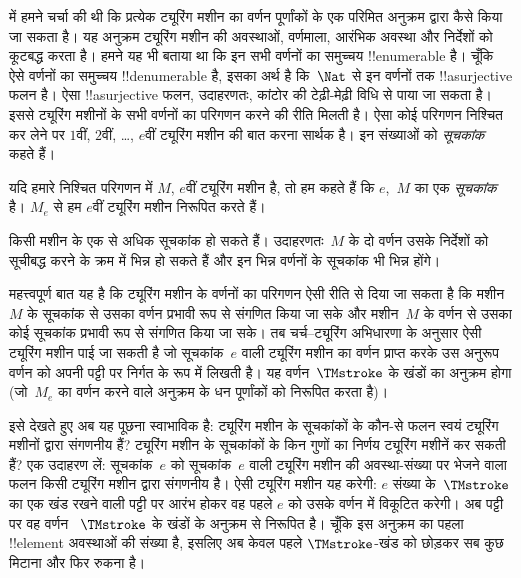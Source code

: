 \documentclass[../../../include/open-logic-section]{subfiles}
\begin{document}

 में हमने चर्चा की थी कि प्रत्येक ट्यूरिंग मशीन का वर्णन
पूर्णांकों के एक परिमित अनुक्रम द्वारा कैसे किया जा सकता है। यह अनुक्रम
ट्यूरिंग मशीन की अवस्थाओं, वर्णमाला, आरंभिक अवस्था और निर्देशों को
कूटबद्ध करता है। हमने यह भी बताया था कि इन सभी वर्णनों का समुच्चय
!!{enumerable} है। चूँकि ऐसे वर्णनों का समुच्चय !!{denumerable} है,
इसका अर्थ है कि~$\Nat$ से इन वर्णनों तक !!a{surjective} फलन है। ऐसा
!!a{surjective} फलन, उदाहरणतः, कांटोर की टेढ़ी-मेढ़ी विधि से पाया जा
सकता है। इससे ट्यूरिंग मशीनों के सभी वर्णनों का परिगणन करने की रीति
मिलती है। ऐसा कोई परिगणन निश्चित कर लेने पर $1$वीं, $2$वीं, \dots,
$e$वीं ट्यूरिंग मशीन की बात करना सार्थक है। इन संख्याओं को
\emph{सूचकांक} कहते हैं।

\begin{defn}
यदि हमारे निश्चित परिगणन में $M$, $e$वीं ट्यूरिंग मशीन है, तो हम कहते
हैं कि $e$,~$M$ का एक \emph{सूचकांक} है। $M_e$ से हम $e$वीं ट्यूरिंग
मशीन निरूपित करते हैं।
\end{defn}

किसी मशीन के एक से अधिक सूचकांक हो सकते हैं। उदाहरणतः~$M$ के दो वर्णन
उसके निर्देशों को सूचीबद्ध करने के क्रम में भिन्न हो सकते हैं और इन
भिन्न वर्णनों के सूचकांक भी भिन्न होंगे।

महत्त्वपूर्ण बात यह है कि ट्यूरिंग मशीन के वर्णनों का परिगणन ऐसी रीति
से दिया जा सकता है कि मशीन~$M$ के सूचकांक से उसका वर्णन प्रभावी रूप से
संगणित किया जा सके और मशीन~$M$ के वर्णन से उसका कोई सूचकांक प्रभावी रूप
से संगणित किया जा सके। तब चर्च--ट्यूरिंग अभिधारणा के अनुसार ऐसी ट्यूरिंग
मशीन पाई जा सकती है जो सूचकांक~$e$ वाली ट्यूरिंग मशीन का वर्णन प्राप्त
करके उस अनुरूप वर्णन को अपनी पट्टी पर निर्गत के रूप में लिखती है। यह
वर्णन~$\TMstroke$ के खंडों का अनुक्रम होगा (जो~$M_e$ का वर्णन करने वाले
अनुक्रम के धन पूर्णांकों को निरूपित करता है)।

इसे देखते हुए अब यह पूछना स्वाभाविक है: ट्यूरिंग मशीन के सूचकांकों के
कौन-से फलन स्वयं ट्यूरिंग मशीनों द्वारा संगणनीय हैं? ट्यूरिंग मशीन के
सूचकांकों के किन गुणों का निर्णय ट्यूरिंग मशीनें कर सकती हैं? एक उदाहरण
लें: सूचकांक~$e$ को सूचकांक~$e$ वाली ट्यूरिंग मशीन की अवस्था-संख्या पर
भेजने वाला फलन किसी ट्यूरिंग मशीन द्वारा संगणनीय है। ऐसी ट्यूरिंग मशीन
यह करेगी: $e$ संख्या के~$\TMstroke$ का एक खंड रखने वाली पट्टी पर आरंभ
होकर वह पहले $e$ को उसके वर्णन में विकूटित करेगी। अब पट्टी पर वह वर्णन
~$\TMstroke$ के खंडों के अनुक्रम से निरूपित है। चूँकि इस अनुक्रम का पहला
!!{element} अवस्थाओं की संख्या है, इसलिए अब केवल पहले $\TMstroke$-खंड
को छोड़कर सब कुछ मिटाना और फिर रुकना है।
\end{document}
